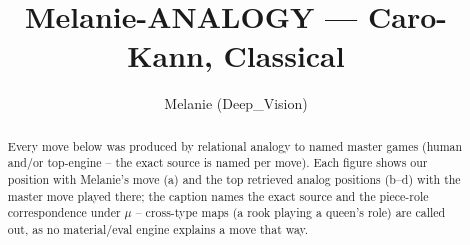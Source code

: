 \documentclass[11pt]{article}
\title{Melanie-ANALOGY — Caro-Kann, Classical}
\author{Melanie (Deep\_Vision)}
\date{}
\begin{document}
\maketitle

\begin{abstract}Every move below was produced by relational analogy to named master games (human and/or top-engine -- the exact source is named per move). Each figure shows our position with Melanie's move (a) and the top retrieved analog positions (b--d) with the master move played there; the caption names the exact source and the piece-role correspondence under $\mu$ -- cross-type maps (a rook playing a queen's role) are called out, as no material/eval engine explains a move that way.\end{abstract}

\begin{figure}[p]\centering
\begin{subfigure}{0.46\textwidth}\centering
\resizebox{\linewidth}{!}{%
\newchessgame
\chessboard[
  setfen={rn1qkbnr/pp2ppp1/2p3bp/8/3P3P/6N1/PPP2PP1/R1BQKBNR w KQkq - 0 7},
  showmover=false,
  pgfstyle=straightmove, color=movearrow, markmove={h1-h3}
]}
\caption{}
\end{subfigure}\hfill
\begin{subfigure}{0.46\textwidth}\centering
\resizebox{\linewidth}{!}{%
\newchessgame
\chessboard[
  setfen={rn1qkbnr/pp2ppp1/2p3bp/8/3P3P/6N1/PPP2PP1/R1BQKBNR w KQkq - 0 7},
  showmover=false,
  pgfstyle=straightmove, color=movearrow, markmove={g1-f3}
]}
\caption{}
\end{subfigure}
\\[4pt]
\begin{subfigure}{0.46\textwidth}\centering
\resizebox{\linewidth}{!}{%
\newchessgame
\chessboard[
  setfen={rn1qkbnr/pp2ppp1/2p3bp/8/3P3P/6N1/PPP2PP1/R1BQKBNR w KQkq - 0 7},
  showmover=false,
  pgfstyle=straightmove, color=movearrow, markmove={g1-f3}
]}
\caption{}
\end{subfigure}\hfill
\begin{subfigure}{0.46\textwidth}\centering
\resizebox{\linewidth}{!}{%
\newchessgame
\chessboard[
  setfen={rn1qkbnr/pp2ppp1/2p3bp/8/3P3P/6N1/PPP2PP1/R1BQKBNR w KQkq - 0 7},
  showmover=false,
  pgfstyle=straightmove, color=movearrow, markmove={g1-f3}
]}
\caption{}
\end{subfigure}

\end{figure}
\end{document}
